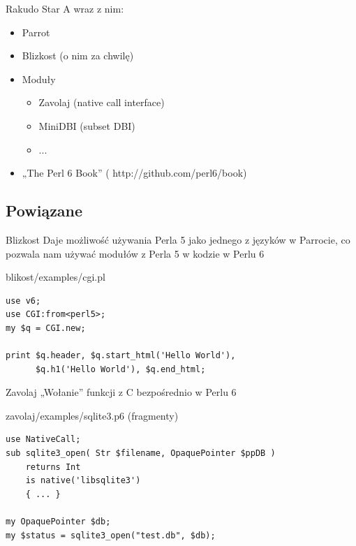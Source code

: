 \documentclass{beamer}
\begin{document}
\begin{frame}{Rakudo Star}
	A wraz z nim:
	\begin{itemize}
		\item Parrot
		\item Blizkost (o nim za chwilę)
		\item Moduły
		\begin{itemize}
			\item Zavolaj (native call interface)
			\item MiniDBI (subset DBI)
			\item ...
		\end{itemize}
	\item „The Perl 6 Book”
		(
		{http://github.com/perl6/book})
	\end{itemize}
\end{frame}

			\subsection{Powiązane}
\begin{frame}[fragile]{Blizkost}
	Daje możliwość używania Perla 5 jako jednego z języków
	w Parrocie, co pozwala nam używać modułów z Perla 5
	w kodzie w Perlu 6
	\begin{block}{blikost/examples/cgi.pl}
\begin{verbatim}
use v6;
use CGI:from<perl5>;
my $q = CGI.new;

print $q.header, $q.start_html('Hello World'),
      $q.h1('Hello World'), $q.end_html;
\end{verbatim}
	\end{block}
\end{frame}

\begin{frame}[fragile]{Zavolaj}
	„Wołanie” funkcji z C bezpośrednio w Perlu 6
	\begin{block}{zavolaj/examples/sqlite3.p6 (fragmenty)}
\begin{verbatim}
use NativeCall;
sub sqlite3_open( Str $filename, OpaquePointer $ppDB )
    returns Int
    is native('libsqlite3')
    { ... }

my OpaquePointer $db;
my $status = sqlite3_open("test.db", $db);
\end{verbatim}
	\end{block}
\end{frame}
\end{document}
